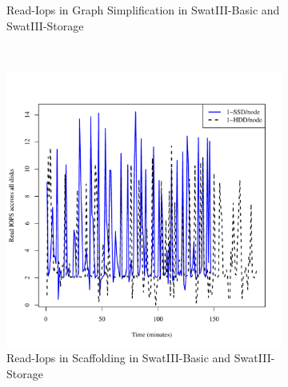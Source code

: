 \documentclass[conference]{IEEEtran}
\begin{document}
\begin{figure}[htb]
\begin{subfigure}[b]{0.3\textwidth}
                \caption{Read-Iops in Graph Simplification in SwatIII-Basic and SwatIII-Storage}
                \label{fig:ECHddSsdRdIops}
        \end{subfigure}
        ~ %
        \begin{subfigure}[b]{0.3\textwidth}
                \includegraphics[width=\textwidth]{Figure/SystemData/Plots/SCFHddSsdRdIops.pdf}
                \caption{Read-Iops in Scaffolding in SwatIII-Basic and SwatIII-Storage}
                \label{fig:SCFHddSsdRdIops}
        \end{subfigure}        
        \begin{subfigure}[b]{0.3\textwidth}

\end{subfigure}
\end{figure}
\end{document}
